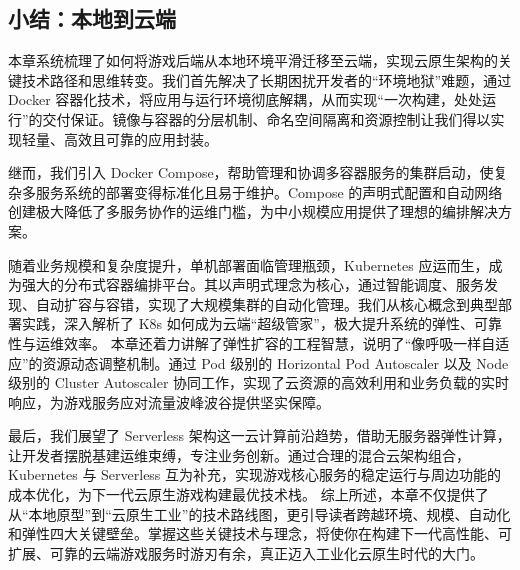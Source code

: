 \subsection{小结：本地到云端}
本章系统梳理了如何将游戏后端从本地环境平滑迁移至云端，实现云原生架构的关键技术路径和思维转变。我们首先解决了长期困扰开发者的“环境地狱”难题，通过 Docker 容器化技术，将应用与运行环境彻底解耦，从而实现“一次构建，处处运行”的交付保证。镜像与容器的分层机制、命名空间隔离和资源控制让我们得以实现轻量、高效且可靠的应用封装。

继而，我们引入 Docker Compose，帮助管理和协调多容器服务的集群启动，使复杂多服务系统的部署变得标准化且易于维护。Compose 的声明式配置和自动网络创建极大降低了多服务协作的运维门槛，为中小规模应用提供了理想的编排解决方案。

随着业务规模和复杂度提升，单机部署面临管理瓶颈，Kubernetes 应运而生，成为强大的分布式容器编排平台。其以声明式理念为核心，通过智能调度、服务发现、自动扩容与容错，实现了大规模集群的自动化管理。我们从核心概念到典型部署实践，深入解析了 K8s 如何成为云端“超级管家”，极大提升系统的弹性、可靠性与运维效率。
本章还着力讲解了弹性扩容的工程智慧，说明了“像呼吸一样自适应”的资源动态调整机制。通过 Pod 级别的 Horizontal Pod Autoscaler 以及 Node 级别的 Cluster Autoscaler 协同工作，实现了云资源的高效利用和业务负载的实时响应，为游戏服务应对流量波峰波谷提供坚实保障。

最后，我们展望了 Serverless 架构这一云计算前沿趋势，借助无服务器弹性计算，让开发者摆脱基建运维束缚，专注业务创新。通过合理的混合云架构组合，Kubernetes 与 Serverless 互为补充，实现游戏核心服务的稳定运行与周边功能的成本优化，为下一代云原生游戏构建最优技术栈。
综上所述，本章不仅提供了从“本地原型”到“云原生工业”的技术路线图，更引导读者跨越环境、规模、自动化和弹性四大关键壁垒。掌握这些关键技术与理念，将使你在构建下一代高性能、可扩展、可靠的云端游戏服务时游刃有余，真正迈入工业化云原生时代的大门。

\newpage